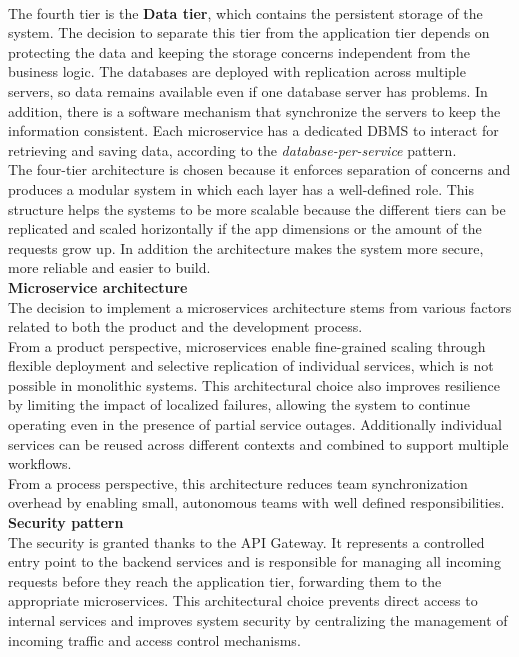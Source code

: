 \\[5pt]
The fourth tier is the \textbf{Data tier}, which contains the persistent storage of the system. The decision to separate this tier from the application tier depends on protecting the data and keeping the storage concerns independent from the business logic. The databases are deployed with replication across multiple servers, so data remains available even if one database server has problems. In addition, there is a software mechanism that synchronize the servers to keep the information consistent. Each microservice has a dedicated DBMS to interact for retrieving and saving data, according to the \textit{database-per-service} pattern. 
\\[5pt]
The four-tier architecture is chosen because it enforces separation of concerns and produces a modular system in which each layer has a well-defined role. This structure helps the systems to be more scalable because the different tiers can be replicated and scaled horizontally if the app dimensions or the amount of the requests grow up. In addition the architecture makes the system more secure, more reliable and easier to build.
\\[8pt]
\textbf{Microservice architecture}\\
The decision to implement a microservices architecture stems from various factors related to both the product and the development process. \\[5pt]
From a product perspective, microservices enable fine-grained scaling through flexible deployment and selective replication of individual services, which is not possible in monolithic systems. This architectural choice also improves resilience by limiting the impact of localized failures, allowing the system to continue operating even in the presence of partial service outages.
Additionally individual services can be reused across different contexts and combined to support multiple workflows.\\[5pt]
From a process perspective, this architecture reduces team synchronization overhead by enabling small, autonomous teams with well defined responsibilities. 
\\[8pt]
\textbf{Security pattern}\\[5pt]
The security is granted thanks to the API Gateway. It represents a controlled entry point to the backend services and is responsible for managing all incoming requests before they reach the application tier, forwarding them to the appropriate microservices. This architectural choice prevents direct access to internal services and improves system security by centralizing the management of incoming traffic and access control mechanisms.\\[3pt]
